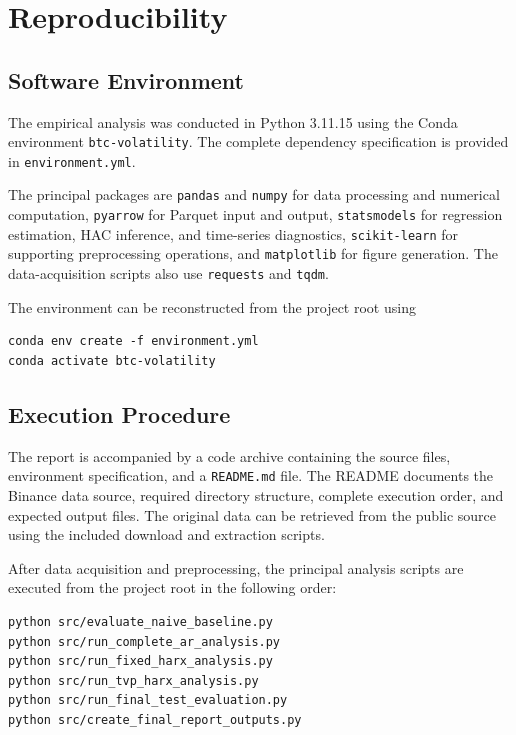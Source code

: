 \section{Reproducibility}

\subsection{Software Environment}

The empirical analysis was conducted in Python 3.11.15 using
the Conda environment \texttt{btc-volatility}. The complete
dependency specification is provided in
\texttt{environment.yml}.

The principal packages are \texttt{pandas} and \texttt{numpy}
for data processing and numerical computation,
\texttt{pyarrow} for Parquet input and output,
\texttt{statsmodels} for regression estimation, HAC inference,
and time-series diagnostics, \texttt{scikit-learn} for
supporting preprocessing operations, and \texttt{matplotlib}
for figure generation. The data-acquisition scripts also use
\texttt{requests} and \texttt{tqdm}.

The environment can be reconstructed from the project root
using

\begin{verbatim}
conda env create -f environment.yml
conda activate btc-volatility
\end{verbatim}

\subsection{Execution Procedure}

The report is accompanied by a code archive containing the
source files, environment specification, and a
\texttt{README.md} file. The README documents the Binance data
source, required directory structure, complete execution order,
and expected output files. The original data can be retrieved
from the public source using the included download and
extraction scripts.

After data acquisition and preprocessing, the principal
analysis scripts are executed from the project root in the
following order:

\begin{verbatim}
python src/evaluate_naive_baseline.py
python src/run_complete_ar_analysis.py
python src/run_fixed_harx_analysis.py
python src/run_tvp_harx_analysis.py
python src/run_final_test_evaluation.py
python src/create_final_report_outputs.py
\end{verbatim}


